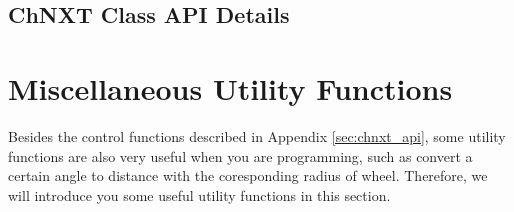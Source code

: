 \clearpage
\newpage
\subsection{ChNXT Class API Details}


\clearpage
\newpage
\section{\label{sec:ultility_functions}Miscellaneous Utility Functions}
Besides the control functions described in Appendix \ref{sec:chnxt_api}, some utility functions are
also very useful when you are programming, such as convert a certain angle to distance with the 
coresponding radius of wheel. Therefore, we will introduce you some useful utility functions in 
this section.\\

